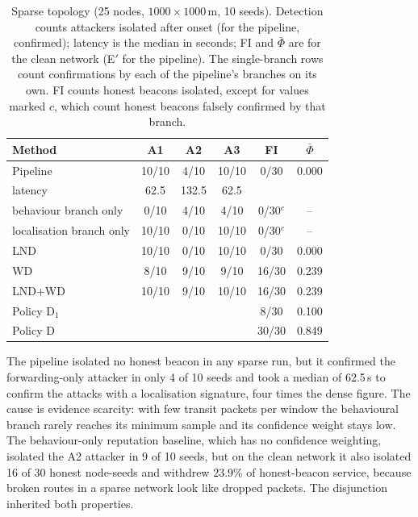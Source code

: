 \begin{table}[!t]
\caption{Sparse topology (25 nodes, $1000 \times 1000$\,m, 10 seeds).
Detection counts attackers isolated after onset (for the pipeline, confirmed);
latency is the median in seconds; FI and $\bar\Phi$ are for the clean network
(E$'$ for the pipeline). The single-branch rows count confirmations by each of
the pipeline's branches on its own. FI counts honest beacons isolated, except
for values marked $c$, which count honest beacons falsely confirmed by that
branch.}
\label{tab:sparse}
\centering
\footnotesize
\setlength{\tabcolsep}{4pt}
\begin{tabular}{@{}lccccc@{}}
\toprule
Method & A1 & A2 & A3 & FI & $\bar\Phi$ \\
\midrule
Pipeline & 10/10 & 4/10 & 10/10 & 0/30 & 0.000 \\
\quad latency & 62.5 & 132.5 & 62.5 & & \\
\quad behaviour branch only & 0/10 & 4/10 & 4/10 & 0/30$^{c}$ & -- \\
\quad localisation branch only & 10/10 & 0/10 & 10/10 & 0/30$^{c}$ & -- \\
LND & 10/10 & 0/10 & 10/10 & 0/30 & 0.000 \\
WD & 8/10 & 9/10 & 9/10 & 16/30 & 0.239 \\
LND+WD & 10/10 & 9/10 & 10/10 & 16/30 & 0.239 \\
Policy D$_1$ & & & & 8/30 & 0.100 \\
Policy D & & & & 30/30 & 0.849 \\
\bottomrule
\end{tabular}
\end{table}

The pipeline isolated no honest beacon in any sparse run, but it confirmed
the forwarding-only attacker in only 4 of 10 seeds and took a median of
62.5\,s to confirm the attacks with a localisation signature, four times the
dense figure. The cause is evidence scarcity: with few transit packets per
window the behavioural branch rarely reaches its minimum sample and its
confidence weight stays low. The behaviour-only reputation baseline, which
has no confidence weighting, isolated the A2 attacker in 9 of 10 seeds, but
on the clean network it also isolated 16 of 30 honest node-seeds and withdrew
23.9\% of honest-beacon service, because broken routes in a sparse network
look like dropped packets. The disjunction inherited both properties.

